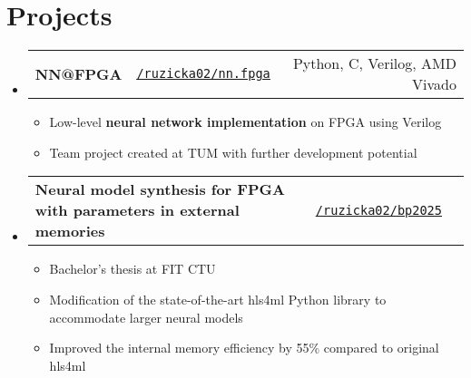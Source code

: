 \documentclass[a4paper,11pt]{article}
\makeatletter
\newcommand{\resumeItem}[1]{
  \item\small{#1}
}
\newcommand{\resumeItemListStart}{\begin{itemize}[rightmargin=0.11in]}
\newcommand{\resumeItemListEnd}{\end{itemize}}
\newcommand{\resumeTrioHeading}[3]{
  \item\small{
    \begin{tabular*}{0.96\textwidth}[t]{
      l l@{\extracolsep{\fill}}r
    }
      \textbf{#1 \quad{}} & \texttt{#2} & #3
    \end{tabular*}
  }
}
\newcommand{\resumeHeadingListStart}{
  \begin{itemize}[leftmargin=0.15in, label={}]
}
\newcommand{\resumeHeadingListEnd}{\end{itemize}}
\makeatother
\begin{document}
\section{Projects}
  \resumeHeadingListStart{}
    \resumeTrioHeading
    {NN@FPGA}
    {\href{https://github.com/ruzicka02/NN.FPGA}{\uline{\faIcon{github}/ruzicka02/nn.fpga}}}
    {Python, C, Verilog, AMD Vivado}
    \resumeItemListStart{}
      \resumeItem{Low-level \textbf{neural network implementation} on FPGA using Verilog}
      \resumeItem{Team project created at TUM with further development potential}
    \resumeItemListEnd{}

    \resumeTrioHeading
    {Neural model synthesis for FPGA with parameters in external memories}
    {\href{https://github.com/ruzicka02/bp2025}{\uline{\faIcon{github}/ruzicka02/bp2025}}}
    {}
    \resumeItemListStart{}
      \resumeItem{Bachelor's thesis at FIT CTU}
      \resumeItem{Modification of the state-of-the-art hls4ml Python library to accommodate larger neural models}
      \resumeItem{Improved the internal memory efficiency by 55\% compared to original hls4ml}
    \resumeItemListEnd{}



  \resumeHeadingListEnd{}
\end{document}
